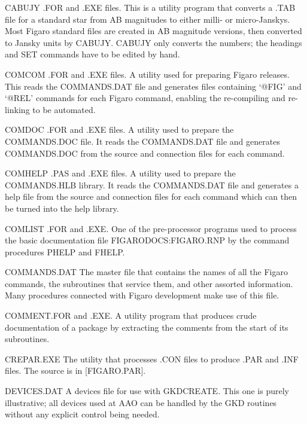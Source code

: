 \begin{description} 

\item CABUJY .FOR and .EXE files. This is a utility program that 
converts a .TAB file for a standard star from AB magnitudes to either 
milli- or micro-Janskys. Most Figaro standard files are created in AB
magnitude versions, then converted to Jansky units by CABUJY. CABUJY only
converts the numbers; the headings and SET commands have to be edited by
hand.

\item COMCOM .FOR and .EXE files. A utility used for preparing Figaro 
releases. This reads the COMMANDS.DAT file and generates files 
containing `@FIG' and `@REL' commands for each Figaro command, enabling the 
re-compiling and re-linking to be automated.

\item COMDOC .FOR and .EXE files. A utility used to prepare the 
COMMANDS.DOC file. It reads the COMMANDS.DAT file and generates 
COMMANDS.DOC from the source and connection files for each command.

\item COMHELP .PAS and .EXE files.  A utility used to prepare the 
COMMANDS.HLB library.  It reads the COMMANDS.DAT file and generates a help
file from the source and connection files for each command which can then be
turned into the help library.

\item COMLIST .FOR and .EXE.  One of the pre-processor programs used to 
process the basic documentation file FIGARODOCS:FIGARO.RNP by the command
procedures PHELP and FHELP.

\item COMMANDS.DAT The master file that contains the names of all the Figaro 
commands, the subroutines that service them, and other assorted information. 
Many procedures connected with Figaro development make use of this file.

\item COMMENT.FOR and .EXE.  A utility program that produces  crude 
documentation of a package by extracting the comments from the start 
of its subroutines.

\item CREPAR.EXE The utility that processes .CON files to produce .PAR and 
.INF files.  The source is in [FIGARO.PAR].

\item DEVICES.DAT A devices file for use with GKDCREATE. This one is purely
illustrative; all devices used at AAO can be handled by the GKD routines 
without any explicit control being needed.


\end{description}
